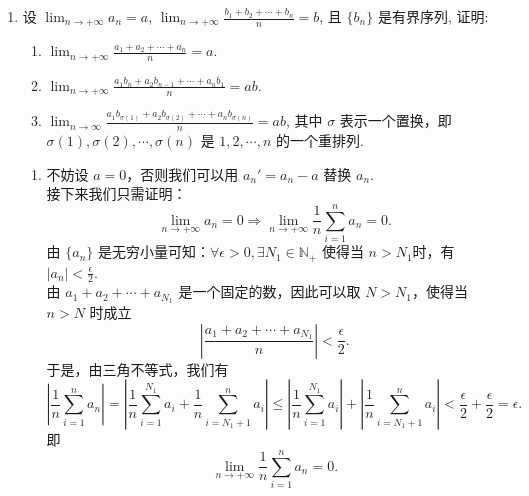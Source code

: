 \begin{enumerate}
    \item[8.]设 $\displaystyle \lim_{n \to +\infty} a_{n} = a$, $\displaystyle \lim_{n \to +\infty} \frac{b_{1} + b_{2} + \cdots + b_{n}}{n} = b$, 且 $\{b_{n}\}$ 是有界序列, 证明:
    \begin{enumerate}
        \item[(a)]$\displaystyle \lim_{n \to +\infty} \frac{a_{1} + a_{2} + \cdots + a_{n}}{n} = a.$
        \item[(b)]$\displaystyle \lim_{n \to +\infty} \frac{a_{1}b_{n} + a_{2}b_{n - 1} + \cdots + a_{n}b_{1}}{n} = ab.$
        \item[(c)]$\displaystyle \lim_{n \to \infty} \frac{a_{1}b_{\sigma(1)} + a_{2}b_{\sigma(2)} + \cdots + a_{n}b_{\sigma(n)}}{n} = ab$, 其中 $\sigma$ 表示一个置换，即 $\sigma(1), \sigma(2), \cdots, \sigma(n)$ 是 $1, 2, \cdots , n$ 的一个重排列.
    \end{enumerate}
    \begin{solution}
        \begin{enumerate}
        \item[(a)] 不妨设 $a=0$，否则我们可以用 $a_{n}'=a_{n}-a$ 替换 $a_{n}$.\\
        接下来我们只需证明：
        \[
        \lim_{n \to +\infty} a_{n}=0 \Rightarrow \lim_{n \to +\infty}\frac{1}{n}\sum_{i=1}^{n}a_{n}=0.
        \]
        由 $\{a_{n}\}$ 是无穷小量可知：$
        \forall \epsilon>0, \exists N_{1}\in\mathbb{N}_{+}$ 使得当 $\displaystyle n>N_{1}$时，有 $\left|a_{n}\right|<\frac{\epsilon}{2}$.\\
        由 $a_{1}+a_{2}+\cdots+a_{N_{1}}$ 是一个固定的数，因此可以取 $N>N_{1}$，使得当 $n>N$ 时成立
        \[
        \left|\frac{a_{1}+a_{2}+\cdots+a_{N_{1}}}{n}\right|<\frac{\epsilon}{2}.
        \]
        于是，由三角不等式，我们有
        \[
        \left|\frac{1}{n}\sum_{i=1}^{n}a_{n}\right|
        =\left|\frac{1}{n}\sum_{i=1}^{N_{1}}a_{i}+\frac{1}{n}\sum_{i=N_{1}+1}^{n}a_{i}\right|
        \leq \left|\frac{1}{n}\sum_{i=1}^{N_{1}}a_{i}\right|+\left|\frac{1}{n}\sum_{i=N_{1}+1}^{n}a_{i}\right|
        <\frac{\epsilon}{2}+\frac{\epsilon}{2}=\epsilon.
        \]
        即
        \[
        \lim_{n \to +\infty}\frac{1}{n}\sum_{i=1}^{n}a_{n}=0.
        \]


\end{enumerate}
\end{solution}
\end{enumerate}
